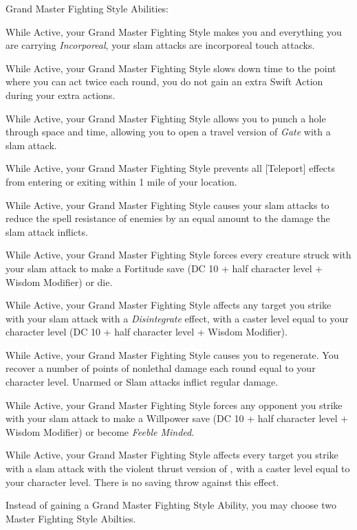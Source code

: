 Grand Master Fighting Style Abilities:
\begin{itemize*}
\item While Active, your Grand Master Fighting Style makes you and everything you are carrying \textit{Incorporeal}, your slam attacks are incorporeal touch attacks.
\item While Active, your Grand Master Fighting Style slows down time to the point where you can act twice each round, you do not gain an extra Swift Action during your extra actions.
\item While Active, your Grand Master Fighting Style allows you to punch a hole through space and time, allowing you to open a travel version of \textit{Gate} with a slam attack.
\item While Active, your Grand Master Fighting Style prevents all [Teleport] effects from entering or exiting within 1 mile of your location.
\item While Active, your Grand Master Fighting Style causes your slam attacks to reduce the spell resistance of enemies by an equal amount to the damage the slam attack inflicts.
\item While Active, your Grand Master Fighting Style forces every creature struck with your slam attack to make a Fortitude save (DC 10 + half character level + Wisdom Modifier) or die.
\item While Active, your Grand Master Fighting Style affects any target you strike with your slam attack with a \textit{Disintegrate} effect, with a caster level equal to your character level (DC 10 + half character level + Wisdom Modifier).
\item While Active, your Grand Master Fighting Style causes you to regenerate. You recover a number of points of nonlethal damage each round equal to your character level. Unarmed or Slam attacks inflict regular damage.
\item While Active, your Grand Master Fighting Style forces any opponent you strike with your slam attack to make a Willpower save (DC 10 + half character level + Wisdom Modifier) or become \textit{Feeble Minded}.
\item While Active, your Grand Master Fighting Style affects every target you strike with a slam attack with the violent thrust version of , with a caster level equal to your character level. There is no saving throw against this effect.
\item Instead of gaining a Grand Master Fighting Style Ability, you may choose two Master Fighting Style Abilties.
\end{itemize*}

